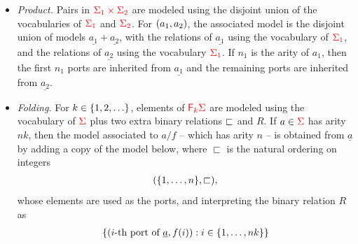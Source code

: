 \begin{definition}
\begin{itemize}
        \item \emph{Product.}   Pairs in   ${\color{red}{\Sigma_1 \times\Sigma_2}}$ are modeled
        using the disjoint union of the vocabularies of ${\color{red}{\Sigma_1}}$ and ${\color{red}{\Sigma_2}}$. 
            For  $(a_1,a_2)$, the associated model is    the disjoint union of models $\underline{a_1} + \underline {a_2}$, with the relations of $\underline {a_1}$ using the  vocabulary of ${{\color{red}{\Sigma_1}}}$, and the relations of $\underline {a_2}$ using the vocabulary  ${{\color{red}{\Sigma_1}}}$. 
            If $n_1$ is the arity of $a_1$, then the first $n_1$ ports are inherited from  $\underline {a_1}$ and the remaining ports are inherited from  $\underline {a_2}$.
        \item \emph{Folding.}   For $k \in \{1,2,\ldots\}$, elements of   ${\color{red}{\mathsf F_{k}}}{\color{red}{\Sigma}}$ are modeled using the  vocabulary of ${\color{red}{\Sigma}}$ plus two extra binary relations $\sqsubset$ and $R$. If $a \in {\color{red}{\Sigma}}$ has arity $nk$, then the model associated to $a/f$ -- which has arity $n$ --   is obtained from  $\underline{a}$ by adding a copy of the model below, where $\sqsubset$ is the natural ordering on integers
                \begin{align*}
                (\{1,\ldots,n\}, \sqsubset),
                \end{align*}
whose elements are used as the ports, and interpreting the binary relation $R$ as
        \begin{align*}
        \{(\text{$i$-th port of $\underline a$},f(i)) : i \in \{1,\ldots,nk\}\}
        \end{align*}
                

\end{itemize}
\end{definition}

